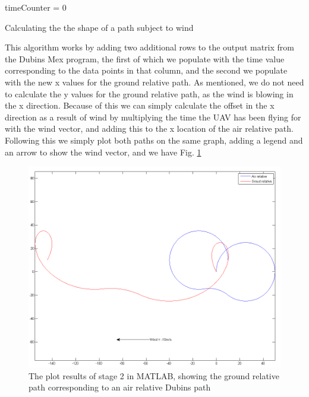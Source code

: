\begin{center}
\begin{minipage}{\linewidth}
\begin{algorithm}[H]
\label{pp2Algorithm}
\SetAlgoLined
	timeCounter = 0\;
\caption{Calculating the the shape of a path subject to wind}
\end{algorithm}
\end{minipage}
\end{center}


This algorithm works by adding two additional rows to the output matrix from the Dubins Mex program, the first of which we populate with the time value corresponding to the data points in that column, and the second we populate with the new x values for the ground relative path. As mentioned, we do not need to calculate the y values for the ground relative path, as the wind is blowing in the x direction. Because of this we can simply calculate the offset in the x direction as a result of wind by multiplying the time the UAV has been flying for with the wind vector, and adding this to the x location of the air relative path. Following this we simply plot both paths on the same graph, adding a legend and an arrow to show the wind vector, and we have Fig. \ref{fig:pp2demo}

\begin{figure}[htbp!] 
\centering    
\includegraphics[width=\textwidth]{PP2_Demo}
\caption[Plotting the effects of wind on Dubins paths in MATLAB]{The plot results of stage 2 in MATLAB, showing the ground relative path corresponding to an air relative Dubins path}
\label{fig:pp2demo}
\end{figure}

